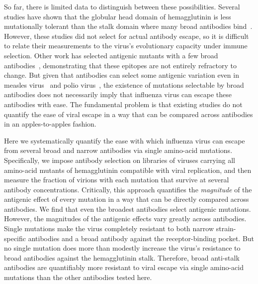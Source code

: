 \documentclass[11pt]{article}
\begin{document}
So far, there is limited data to distinguish between these possibilities.
Several studies have shown that the globular head domain of hemagglutinin is less mutationally tolerant than the stalk domain where many broad antibodies bind~\citep{thyagarajan2014inherent,wu2014high,heaton2013genome}.
However, these studies did not select for actual antibody escape, so it is difficult to relate their measurements to the virus's evolutionary capacity under immune selection.
Other work has selected antigenic mutants with a few broad antibodies~\citep{yoshida2009cross,chai2016two}, demonstrating that these epitopes are not entirely refractory to change.
But given that antibodies can select some antigenic variation even in measles virus~\citep{birrer1981antigenic,ter1981antigenic} and polio virus~\citep{crainic1983natural,diamond1985antigenic}, the existence of mutations selectable by broad antibodies does not necessarily imply that influenza virus can escape these antibodies with ease.
The fundamental problem is that existing studies do not quantify the ease of viral escape in a way that can be compared across antibodies in an apples-to-apples fashion.

Here we systematically quantify the ease with which influenza virus can escape from several broad and narrow antibodies via single amino-acid mutations.
Specifically, we impose antibody selection on libraries of viruses carrying all amino-acid mutants of hemagglutinin compatible with viral replication, and then measure the fraction of virions with each mutation that survive at several antibody concentrations.
Critically, this approach quantifies the \emph{magnitude} of the antigenic effect of every mutation in a way that can be directly compared across antibodies.
We find that even the broadest antibodies select antigenic mutations.
However, the magnitudes of the antigenic effects vary greatly across antibodies.
Single mutations make the virus completely resistant to both narrow strain-specific antibodies and a broad antibody against the receptor-binding pocket.
But no single mutation does more than modestly increase the virus's resistance to broad antibodies against the hemagglutinin stalk.
Therefore, broad anti-stalk antibodies are quantifiably more resistant to viral escape via single amino-acid mutations than the other antibodies tested here. 


\end{document}
